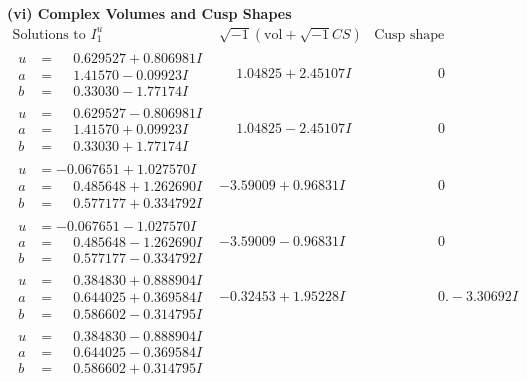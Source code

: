\documentclass[1p]{elsarticle_modified}
\theoremstyle{definition}
\newcommand{\I}{\sqrt{-1}}
\begin{document}
\newpage\flushleft \textbf{(vi) Complex Volumes and Cusp Shapes}
$$\begin{array}{c|c|c}  
\text{Solutions to }I^u_{1}& \I (\text{vol} + \sqrt{-1}CS) & \text{Cusp shape}\\
 \hline 
\begin{aligned}
u &= \phantom{-}0.629527 + 0.806981 I \\
a &= \phantom{-}1.41570 - 0.09923 I \\
b &= \phantom{-}0.33030 - 1.77174 I\end{aligned}
 & \phantom{-}1.04825 + 2.45107 I & \phantom{-0.000000 } 0 \\ \hline\begin{aligned}
u &= \phantom{-}0.629527 - 0.806981 I \\
a &= \phantom{-}1.41570 + 0.09923 I \\
b &= \phantom{-}0.33030 + 1.77174 I\end{aligned}
 & \phantom{-}1.04825 - 2.45107 I & \phantom{-0.000000 } 0 \\ \hline\begin{aligned}
u &= -0.067651 + 1.027570 I \\
a &= \phantom{-}0.485648 + 1.262690 I \\
b &= \phantom{-}0.577177 + 0.334792 I\end{aligned}
 & -3.59009 + 0.96831 I & \phantom{-0.000000 } 0 \\ \hline\begin{aligned}
u &= -0.067651 - 1.027570 I \\
a &= \phantom{-}0.485648 - 1.262690 I \\
b &= \phantom{-}0.577177 - 0.334792 I\end{aligned}
 & -3.59009 - 0.96831 I & \phantom{-0.000000 } 0 \\ \hline\begin{aligned}
u &= \phantom{-}0.384830 + 0.888904 I \\
a &= \phantom{-}0.644025 + 0.369584 I \\
b &= \phantom{-}0.586602 - 0.314795 I\end{aligned}
 & -0.32453 + 1.95228 I & \phantom{-0.000000 } 0. - 3.30692 I \\ \hline\begin{aligned}
u &= \phantom{-}0.384830 - 0.888904 I \\
a &= \phantom{-}0.644025 - 0.369584 I \\
b &= \phantom{-}0.586602 + 0.314795 I\end{aligned}

\end{array}$$
\end{document}
